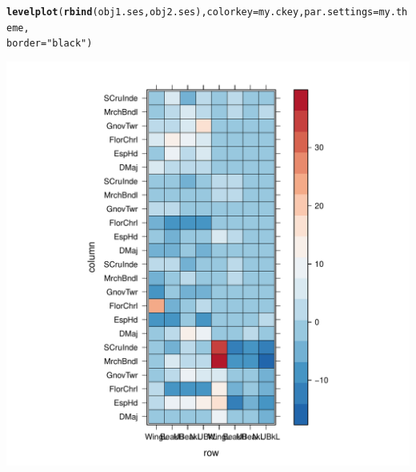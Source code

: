 \documentclass[12pt]{article}\usepackage[]{graphicx}\usepackage[]{color}
\makeatletter
\def\maxwidth{ %
  \ifdim\Gin@nat@width>\linewidth
    \linewidth
  \else
    \Gin@nat@width
  \fi
}
\newcommand{\hlstr}[1]{\textcolor[rgb]{0.192,0.494,0.8}{#1}}%
\newcommand{\hlstd}[1]{\textcolor[rgb]{0.345,0.345,0.345}{#1}}%
\newcommand{\hlkwc}[1]{\textcolor[rgb]{0.333,0.667,0.333}{#1}}%
\newcommand{\hlkwd}[1]{\textcolor[rgb]{0.737,0.353,0.396}{\textbf{#1}}}%
\newenvironment{kframe}{%
 \def\at@end@of@kframe{}%
 \ifinner\ifhmode%
  \def\at@end@of@kframe{\end{minipage}}%
  \begin{minipage}{\columnwidth}%
 \fi\fi%
 \def\FrameCommand##1{\hskip\@totalleftmargin \hskip-\fboxsep
 \colorbox{shadecolor}{##1}\hskip-\fboxsep
     \hskip-\linewidth \hskip-\@totalleftmargin \hskip\columnwidth}%
 \MakeFramed {\advance\hsize-\width
   \@totalleftmargin\z@ \linewidth\hsize
   \@setminipage}}%
 {\par\unskip\endMakeFramed%
 \at@end@of@kframe}
\newenvironment{knitrout}{}{} %
\makeatother
\begin{document}
\begin{knitrout}
\begin{kframe}
\begin{alltt}
\hlkwd{levelplot}\hlstd{(}\hlkwd{rbind}\hlstd{(obj1.ses, obj2.ses),} \hlkwc{colorkey} \hlstd{= my.ckey,} \hlkwc{par.settings} \hlstd{= my.theme,}
    \hlkwc{border} \hlstd{=} \hlstr{"black"}\hlstd{)}
\end{alltt}
\end{kframe}
\includegraphics[width=\maxwidth]{figure/unnamed-chunk-452} 

\end{knitrout}
\end{document}
